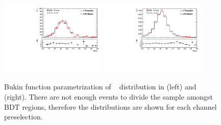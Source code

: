 \begin{figure}[htbp]
  \centering    
 \includegraphics[width=0.45\textwidth]{figures/VBF/SigPar/z_2cen.pdf}
 \includegraphics[width=0.45\textwidth]{figures/VBF/SigPar/z_4cen.pdf}

\caption{Bukin function parametrization of \zjets~\Mbb{} distribution in \twocentral (left) and \fourcentral (right). There are not enough events to divide the sample amongst BDT regions, therefore the distributions are shown for each channel preselection.}
\label{fig:vbf-zpar_alt}
\end{figure}



